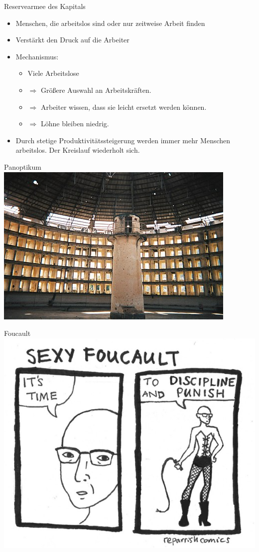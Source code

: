 \documentclass{beamer}
\begin{document}
\begin{frame}{Reservearmee des Kapitals}
\begin{itemize}
    \item Menschen, die arbeitslos sind oder nur zeitweise Arbeit finden
    \item Verstärkt den Druck auf die Arbeiter
    \item Mechanismus:
    \begin{itemize}
        \item Viele Arbeitslose
        \item $\Rightarrow$ Größere Auswahl an Arbeitskräften.
        \item $\Rightarrow$ Arbeiter wissen, dass sie leicht ersetzt werden können.
        \item $\Rightarrow$ Löhne bleiben niedrig.
    \end{itemize}
    \item Durch stetige Produktivitätssteigerung werden immer mehr Menschen arbeitslos. Der Kreislauf wiederholt sich.
\end{itemize}

\end{frame}
\begin{frame}{Panoptikum}
    \includegraphics[width=\textwidth]{panoptikum.jpg}
\end{frame}

\begin{frame}{Foucault}
    \includegraphics[width=\textwidth]{sexy_foucault}
\end{frame}
\end{document}

